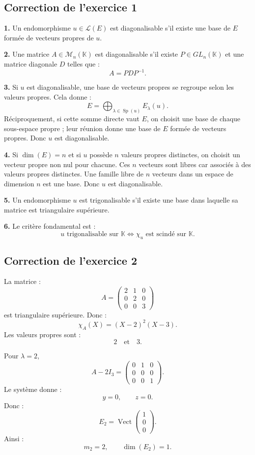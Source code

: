 \documentclass[11pt,a4paper]{article}
\newcommand{\K}{\mathbb K}
\newcommand{\M}{\mathcal M}
\newcommand{\Lcal}{\mathcal L}
\newcommand{\Vect}{\operatorname{Vect}}
\newcommand{\Sp}{\operatorname{Sp}}
\begin{document}
\subsection*{Correction de l'exercice 1}

\textbf{1.}  
Un endomorphisme \(u\in\Lcal(E)\) est diagonalisable s'il existe une base de \(E\) formée de vecteurs propres de \(u\).

\textbf{2.}  
Une matrice \(A\in\M_n(\K)\) est diagonalisable s'il existe \(P\in GL_n(\K)\) et une matrice diagonale \(D\) telles que :
\[
A=PDP^{-1}.
\]

\textbf{3.}  
Si \(u\) est diagonalisable, une base de vecteurs propres se regroupe selon les valeurs propres.  
Cela donne :
\[
E=\bigoplus_{\lambda\in\Sp(u)}E_\lambda(u).
\]
Réciproquement, si cette somme directe vaut \(E\), on choisit une base de chaque sous-espace propre ; leur réunion donne une base de \(E\) formée de vecteurs propres.  
Donc \(u\) est diagonalisable.

\textbf{4.}  
Si \(\dim(E)=n\) et si \(u\) possède \(n\) valeurs propres distinctes, on choisit un vecteur propre non nul pour chacune.  
Ces \(n\) vecteurs sont libres car associés à des valeurs propres distinctes.  
Une famille libre de \(n\) vecteurs dans un espace de dimension \(n\) est une base.  
Donc \(u\) est diagonalisable.

\textbf{5.}  
Un endomorphisme \(u\) est trigonalisable s'il existe une base dans laquelle sa matrice est triangulaire supérieure.

\textbf{6.}  
Le critère fondamental est :
\[
u\text{ trigonalisable sur }\K
\Longleftrightarrow
\chi_u\text{ est scindé sur }\K.
\]

\subsection*{Correction de l'exercice 2}

La matrice :
\[
A=
\begin{pmatrix}
2&1&0\\
0&2&0\\
0&0&3
\end{pmatrix}
\]
est triangulaire supérieure.  
Donc :
\[
\chi_A(X)=(X-2)^2(X-3).
\]
Les valeurs propres sont :
\[
2
\quad\text{et}\quad
3.
\]

Pour \(\lambda=2\),
\[
A-2I_3=
\begin{pmatrix}
0&1&0\\
0&0&0\\
0&0&1
\end{pmatrix}.
\]
Le système donne :
\[
y=0,\qquad z=0.
\]
Donc :
\[
E_2=\Vect
\begin{pmatrix}
1\\0\\0
\end{pmatrix}.
\]
Ainsi :
\[
m_2=2,
\qquad
\dim(E_2)=1.
\]
\end{document}
